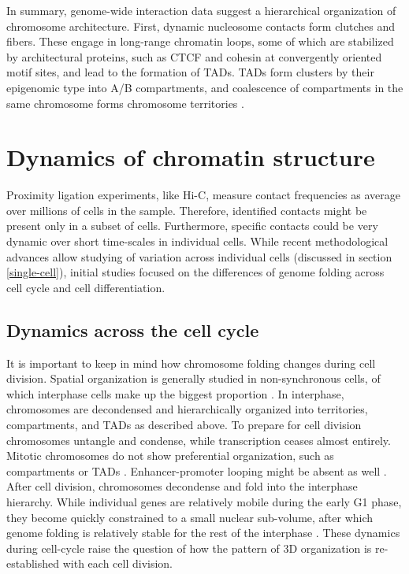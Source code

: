 \documentclass[a4paper,twoside=true,openright,parskip=full,chapterprefix=true,11pt,headings=normal,bibliography=totoc,listof=totoc,titlepage=on,captions=tableabove,draft=false]{scrreprt}
\theoremstyle{definition}
\theoremstyle{definition}
\theoremstyle{definition}
\theoremstyle{remark}
\begin{document}
In summary, genome-wide interaction data suggest a hierarchical
organization of chromosome architecture. First, dynamic nucleosome
contacts form clutches and fibers. These engage in long-range chromatin
loops, some of which are stabilized by architectural proteins, such as
CTCF and cohesin at convergently oriented motif sites, and lead to the
formation of TADs. TADs form clusters by their epigenomic type into A/B
compartments, and coalescence of compartments in the same chromosome
forms chromosome territories \citep{Bonev2016}.

\hypertarget{dynamics-of-chromatin-structure}{%
\section{Dynamics of chromatin
structure}\label{dynamics-of-chromatin-structure}}

Proximity ligation experiments, like Hi-C, measure contact frequencies
as average over millions of cells in the sample. Therefore, identified
contacts might be present only in a subset of cells. Furthermore,
specific contacts could be very dynamic over short time-scales in
individual cells. While recent methodological advances allow studying of
variation across individual cells (discussed in section
\ref{single-cell}), initial studies focused on the differences of genome
folding across cell cycle and cell differentiation.

\hypertarget{dynamics-across-the-cell-cycle}{%
\subsection{Dynamics across the cell
cycle}\label{dynamics-across-the-cell-cycle}}

It is important to keep in mind how chromosome folding changes during
cell division. Spatial organization is generally studied in
non-synchronous cells, of which interphase cells make up the biggest
proportion \citep{Bouwman2015}. In interphase, chromosomes are
decondensed and hierarchically organized into territories, compartments,
and TADs as described above. To prepare for cell division chromosomes
untangle and condense, while transcription ceases almost entirely.
Mitotic chromosomes do not show preferential organization, such as
compartments or TADs \citep{Naumova2013}. Enhancer-promoter looping
might be absent as well \citep{Dekker2014}. After cell division,
chromosomes decondense and fold into the interphase hierarchy. While
individual genes are relatively mobile during the early G1 phase, they
become quickly constrained to a small nuclear sub-volume, after which
genome folding is relatively stable for the rest of the interphase
\citep{Chubb2002, Walter2003}. These dynamics during cell-cycle raise
the question of how the pattern of 3D organization is re-established
with each cell division.
\end{document}
